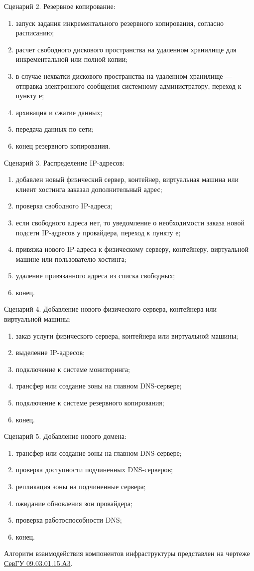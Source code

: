 Сценарий 2. Резервное копирование:
\begin{enumerate}
  \item запуск задания инкрементального резервного копирования, согласно расписанию;
  \item расчет свободного дискового пространства на удаленном хранилище для инкрементальной или полной копии;
  \item в случае нехватки дискового пространства на удаленном хранилище --- отправка электронного сообщения системному администратору, переход к пункту е;
  \item архивация и сжатие данных;
  \item передача данных по сети;
  \item конец резервного копирования.
\end{enumerate}

Сценарий 3. Распределение IP-адресов:
\begin{enumerate}
  \item добавлен новый физический сервер, контейнер, виртуальная машина или клиент хостинга заказал дополнительный адрес;
  \item проверка свободного IP-адреса;
  \item если свободного адреса нет, то уведомление о необходимости заказа новой подсети IP-адресов у провайдера, переход к пункту е;
  \item привязка нового IP-адреса к физическому серверу, контейнеру, виртуальной машине или пользователю хостинга;
  \item удаление привязанного адреса из списка свободных;
  \item конец.
\end{enumerate}

Сценарий 4. Добавление нового физического сервера, контейнера или виртуальной машины:
\begin{enumerate}
  \item заказ услуги физического сервера, контейнера или виртуальной машины;
  \item выделение IP-адресов;
  \item подключение к системе мониторинга;
  \item трансфер или создание зоны на главном DNS-сервере;
  \item подключение к системе резервного копирования;
  \item конец.
\end{enumerate}

Сценарий 5. Добавление нового домена:
\begin{enumerate}
  \item трансфер или создание зоны на главном DNS-сервере;
  \item проверка доступности подчиненных DNS-серверов;
  \item репликация зоны на подчиненные сервера;
  \item ожидание обновления зон провайдера;
  \item проверка работоспособности DNS;
  \item конец.
\end{enumerate}

Алгоритм взаимодействия компонентов инфраструктуры представлен на чертеже \href{extra/drafts/SevGU_09.03.01.15.A3.pdf}{СевГУ 09.03.01.15.А3}.

\clearpage
